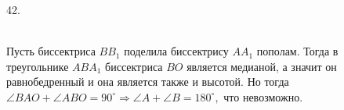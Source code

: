 42. \begin{figure}[ht!]
\end{figure}\\
Пусть биссектриса $BB_1$ поделила биссектрису $AA_1$ пополам. Тогда в треугольнике $ABA_1$ биссектриса $BO$ является медианой, а значит он равнобедренный и она является также и высотой. Но тогда $\angle BAO+\angle ABO=90^\circ\Rightarrow \angle A+\angle B=180^\circ,$ что невозможно.\\
